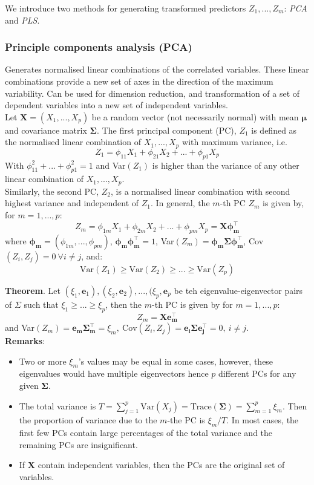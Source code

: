 \documentclass[11pt]{article}
\begin{document}
\noindent We introduce two methods for generating transformed predictors $Z_1,...,Z_m$: \textit{PCA} and \textit{PLS}.

\subsubsection{Principle components analysis (PCA)}
\noindent Generates normalised linear combinations of the correlated variables. These linear combinations provide a new set of axes in the direction of the maximum variability. Can be used for dimension reduction, and transformation of a set of dependent variables into a new set of independent variables. \\

\noindent Let $\boldsymbol{X} = (X_1,...,X_p)$ be a random vector (not necessarily normal) with mean $\boldsymbol{\mu}$ and covariance matrix $\boldsymbol{\Sigma}$. The first principal component (PC), $Z_1$ is defined as the normalised linear combination of $X_1,...,X_p$ with maximum variance, i.e.
$$Z_1 = \phi_{11}X_1 + \phi_{21}X_2 + ... + \phi_{p1}X_p$$
\noindent With $\phi_{11}^2 + ... + \phi_{p1}^2 = 1$ and Var$(Z_1)$ is higher than the variance of any other linear combination of $X_1,...,X_p$. \\

\noindent Similarly, the second PC, $Z_2$, is a normalised linear combination with second highest variance and independent of $Z_1$. In general, the $m$-th PC $Z_m$ is given by, for $m=1,...,p$:
$$Z_m = \phi_{1m}X_1 + \phi_{2m}X_2 + ... + \phi_{pm}X_p = \boldsymbol{X\phi_{m}^{\top}}$$
\noindent where $\boldsymbol{\phi_m} = (\phi_{1m},...,\phi_{pm})$, $\boldsymbol{\phi_m \phi_m^\top} = 1$, Var$(Z_m) = \boldsymbol{\phi_m \Sigma \phi_m^\top}$, Cov$(Z_i, Z_j) = 0 \ \forall i \neq j$, and:
$$\text{Var}(Z_1) \geq \text{Var}(Z_2) \geq ... \geq \text{Var}(Z_p)$$

\noindent \textbf{Theorem}. Let $(\xi_1, \boldsymbol{e}_1), (\xi_2, \boldsymbol{e}_2), ..., (\xi_p, \boldsymbol{e}_p$ be teh eigenvalue-eigenvector pairs of $\Sigma$ such that $\xi_1 \geq ... \geq \xi_p$, then the $m$-th PC is given by for $m = 1,...,p$:
$$Z_m = \boldsymbol{X e_m^{\top}}$$
\noindent and Var$(Z_m) = \boldsymbol{e_m \Sigma_m^{\top}} = \xi_m, \ \text{Cov}(Z_i, Z_j) = \boldsymbol{e_i \Sigma e_j^\top} = 0 , \ i \neq j$. \\

\noindent \textbf{Remarks}:
\begin{itemize}
    \item Two or more $\xi_m$'s values may be equal in some cases, however, these eigenvalues would have multiple eigenvectors hence $p$ different PCs for any given $\boldsymbol{\Sigma}$.
    \item The total variance is $T = \sum_{j=1}^{p}\text{Var}(X_j) = \text{Trace}(\boldsymbol{\Sigma}) = \sum_{m=1}^{p}\xi_m$. Then the proportion of variance due to the $m$-the PC is $\xi_m/T$. In most cases, the first few PCs contain large percentages of the total variance and the remaining PCs are insignificant.
    \item If $\boldsymbol{X}$ contain independent variables, then the PCs are the original set of variables.
\end{itemize} \phantom{i}
\end{document}
